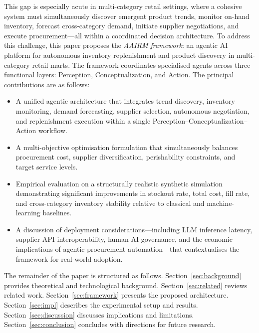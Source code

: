 \documentclass[utf8]{FrontiersinHarvard}
\begin{document}
	This gap is especially acute in multi-category retail settings, where a
	cohesive system must simultaneously discover emergent product trends,
	monitor on-hand inventory, forecast cross-category demand, initiate
	supplier negotiations, and execute procurement---all within a coordinated
	decision architecture.  To address this challenge, this paper proposes
	the \emph{AAIRM framework}: an agentic AI platform for autonomous inventory
	replenishment and product discovery in multi-category retail marts.  The
	framework coordinates specialised agents across three functional layers:
	Perception, Conceptualization, and Action.  The principal contributions
	are as follows:

	\begin{itemize}[leftmargin=*]
		\item A unified agentic architecture that integrates trend discovery,
		inventory monitoring, demand forecasting, supplier selection,
		autonomous negotiation, and replenishment execution within a single
		Perception--Conceptualization--Action workflow.

		\item A multi-objective optimisation formulation that simultaneously
		balances procurement cost, supplier diversification, perishability
		constraints, and target service levels.

		\item Empirical evaluation on a structurally realistic synthetic
		simulation demonstrating significant improvements in stockout rate,
		total cost, fill rate, and cross-category inventory stability
		relative to classical and machine-learning baselines.

		\item A discussion of deployment considerations---including LLM
		inference latency, supplier API interoperability, human-AI
		governance, and the economic implications of agentic procurement
		automation---that contextualises the framework for real-world
		adoption.
	\end{itemize}

	The remainder of the paper is structured as follows.
	Section~\ref{sec:background} provides theoretical and technological
	background.  Section~\ref{sec:related} reviews related work.
	Section~\ref{sec:framework} presents the proposed architecture.
	Section~\ref{sec:impl} describes the experimental setup and results.
	Section~\ref{sec:discussion} discusses implications and limitations.
	Section~\ref{sec:conclusion} concludes with directions for future
	research.
\end{document}
